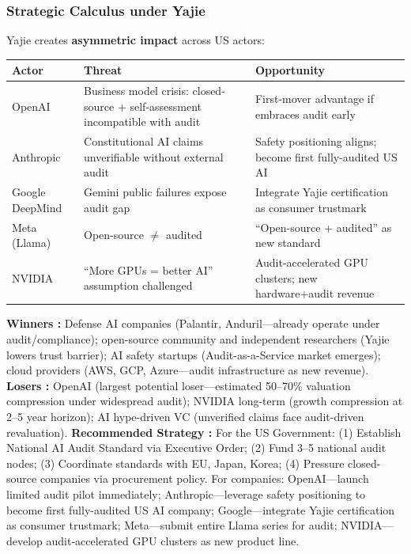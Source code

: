 \documentclass[11pt,a4paper]{article}
\theoremstyle{definition}
\theoremstyle{remark}
\begin{document}
\subsubsection{Strategic Calculus under Yajie }
Yajie creates \textbf{asymmetric impact} across US actors:
\begin{center}
\begin{tabular}{lp{4.5cm}p{4.5cm}}
\toprule
\textbf{Actor } & \textbf{Threat } & \textbf{Opportunity } \\
\midrule
OpenAI & Business model crisis: closed-source + self-assessment incompatible with audit & First-mover advantage if embraces audit early \\
Anthropic & Constitutional AI claims unverifiable without external audit & Safety positioning aligns; become first fully-audited US AI \\
Google DeepMind & Gemini public failures expose audit gap & Integrate Yajie certification as consumer trustmark \\
Meta (Llama) & Open-source $\neq$ audited & ``Open-source + audited'' as new standard \\
NVIDIA & ``More GPUs = better AI'' assumption challenged & Audit-accelerated GPU clusters; new hardware+audit revenue \\
\bottomrule
\end{tabular}
\end{center}
\textbf{Winners :} Defense AI companies (Palantir, Anduril---already operate under audit/compliance); open-source community and independent researchers (Yajie lowers trust barrier); AI safety startups (Audit-as-a-Service market emerges); cloud providers (AWS, GCP, Azure---audit infrastructure as new revenue).
\textbf{Losers :} OpenAI (largest potential loser---estimated 50--70\% valuation compression under widespread audit); NVIDIA long-term (growth compression at 2--5 year horizon); AI hype-driven VC (unverified claims face audit-driven revaluation).
\textbf{Recommended Strategy :}
For the US Government: (1) Establish National AI Audit Standard via Executive Order; (2) Fund 3--5 national audit nodes; (3) Coordinate standards with EU, Japan, Korea; (4) Pressure closed-source companies via procurement policy.
For companies: OpenAI---launch limited audit pilot immediately; Anthropic---leverage safety positioning to become first fully-audited US AI company; Google---integrate Yajie certification as consumer trustmark; Meta---submit entire Llama series for audit; NVIDIA---develop audit-accelerated GPU clusters as new product line.
\end{document}
